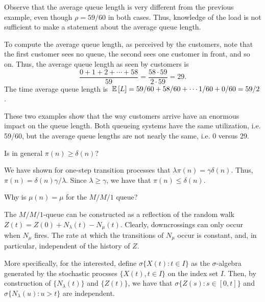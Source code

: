 \begin{question}
\begin{solution}
\begin{enumerate}
  Observe that the average queue length is very different from the
  previous example, even though $\rho = 59/60$ in both cases. Thus,
  knowledge of the load is not sufficient to make a statement about the
  average queue length.

  To compute the average queue length, as perceived by the customers,
  note that the first customer sees no queue, the second sees one
  customer in front, and so on. Thus, the average queue length as seen
  by customers is
  \begin{equation*}
   \frac{0+1+2+\cdots+58}{59}=\frac{58\cdot 59}{2\cdot 59} = 29.
  \end{equation*}
The time average queue length is $\,\mathbb{E}\left[L\right] = 59/60 + 58/60 + \cdots 1/60 + 0/60 = 59/2$. 
\end{enumerate}

These two examples show that the way customers arrive have an enormous
impact on the queue length. Both queueing systems have the same
utilization, i.e. 59/60, but the average queue lengths are not nearly
the same, i.e. 0 versus 29.
  \end{solution}
\end{question}

\begin{question}
  Is in general $\pi(n)\geq \delta(n)$?  
  \begin{solution}
    We have shown for one-step transition processes that
    $\lambda \pi(n) = \gamma \delta(n)$. Thus,
    $\pi(n) = \delta(n)\gamma /\lambda$. Since $\lambda\geq \gamma$,
    we have that $\pi(n) \leq \delta(n)$.
  \end{solution}
\end{question}

\begin{question}
  Why is $\mu(n) = \mu$ for the $M/M/1$ queue?  

 \begin{solution}
   The $M/M/1$-queue can be constructed as a reflection of the random
   walk $Z(t) = Z(0) + N_\lambda(t) - N_\mu(t)$. Clearly,
   downcrossings can only occur when $N_\mu$ fires. The rate at which
   the transitions of $N_\mu$ occur is constant, and, in particular,
   independent of the history of $Z$. 

   More specifically, for the interested, define
   $\sigma\{X(t) : t\in I\}$ as the $\sigma$-algebra generated by the
   stochastic procsses $\{X(t), t\in I\}$ on the index set $I$. Then,
   by construction of $\{N_\lambda(t)\}$ and $\{Z(t)\}$, we have that
   $\sigma\{Z(s) : s\in[0,t]\}$  and $\sigma\{N_\lambda(u) : u > t\}$ are independent.
 \end{solution}
\end{question}


